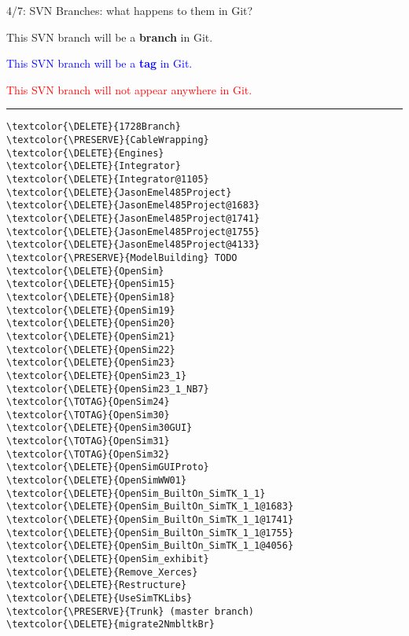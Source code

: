 \documentclass[pdf, 8pt]{beamer}
\def\NUMDECISIONS{7}
\def\DELETE{red}
\def\PRESERVE{green!60!black}
\def\TOTAG{blue}
\begin{document}
\begin{frame}[fragile]{4/\NUMDECISIONS: SVN Branches: what happens to them in Git?}

\textcolor{\PRESERVE}{This SVN branch will be a \textbf{branch} in Git.}

\textcolor{\TOTAG}{This SVN branch will be a \textbf{tag} in Git.}

\textcolor{\DELETE}{This SVN branch will not appear anywhere in Git.}

\hrule
\begin{multicols}{2}
\begin{Verbatim}
\textcolor{\DELETE}{1728Branch}
\textcolor{\PRESERVE}{CableWrapping}
\textcolor{\DELETE}{Engines}
\textcolor{\DELETE}{Integrator}
\textcolor{\DELETE}{Integrator@1105}
\textcolor{\DELETE}{JasonEmel485Project}
\textcolor{\DELETE}{JasonEmel485Project@1683}
\textcolor{\DELETE}{JasonEmel485Project@1741}
\textcolor{\DELETE}{JasonEmel485Project@1755}
\textcolor{\DELETE}{JasonEmel485Project@4133}
\textcolor{\PRESERVE}{ModelBuilding} TODO
\textcolor{\DELETE}{OpenSim}
\textcolor{\DELETE}{OpenSim15}
\textcolor{\DELETE}{OpenSim18}
\textcolor{\DELETE}{OpenSim19}
\textcolor{\DELETE}{OpenSim20}
\textcolor{\DELETE}{OpenSim21}
\textcolor{\DELETE}{OpenSim22}
\textcolor{\DELETE}{OpenSim23}
\textcolor{\DELETE}{OpenSim23_1}
\textcolor{\DELETE}{OpenSim23_1_NB7}
\textcolor{\TOTAG}{OpenSim24}
\textcolor{\TOTAG}{OpenSim30}
\textcolor{\DELETE}{OpenSim30GUI}
\textcolor{\TOTAG}{OpenSim31}
\textcolor{\TOTAG}{OpenSim32}
\textcolor{\DELETE}{OpenSimGUIProto}
\textcolor{\DELETE}{OpenSimWW01}
\textcolor{\DELETE}{OpenSim_BuiltOn_SimTK_1_1}
\textcolor{\DELETE}{OpenSim_BuiltOn_SimTK_1_1@1683}
\textcolor{\DELETE}{OpenSim_BuiltOn_SimTK_1_1@1741}
\textcolor{\DELETE}{OpenSim_BuiltOn_SimTK_1_1@1755}
\textcolor{\DELETE}{OpenSim_BuiltOn_SimTK_1_1@4056}
\textcolor{\DELETE}{OpenSim_exhibit}
\textcolor{\DELETE}{Remove_Xerces}
\textcolor{\DELETE}{Restructure}
\textcolor{\DELETE}{UseSimTKLibs}
\textcolor{\PRESERVE}{Trunk} (master branch)
\textcolor{\DELETE}{migrate2NmbltkBr}
\end{Verbatim}
\end{multicols}
\end{frame}
\end{document}
